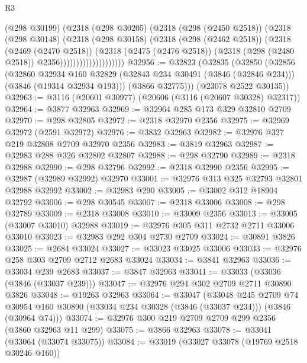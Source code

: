 \begin{lexlean}{R3}
\begin{coremodule}
                            (@298 @30199)
                            (@2318
                              (@298 @30205)
                              (@2318
                                (@298 (@2450 @2518))
                                (@2318
                                  (@298 @30148)
                                  (@2318
                                    (@298 @30158)
                                    (@2318
                                      (@298 (@2462 @2518))
                                      (@2318
                                        (@2469 (@2470 @2518))
                                        (@2318
                                          (@2475 (@2476 @2518))
                                          (@2318 (@298 (@2480 @2518)) @2356))))))))))))))))))))
@32956 := @32823
    (@32835
      (@32850
        (@32856
          (@32860
            @32934
            @160
            @32829
            (@32843 @234 @30491 (@3846 (@32846 @234)))
            (@3846 (@19314 @32934 @193)))
          (@3866 @32775)))
      (@23078 @2522 @30135))
@32963 := @3116 (@20601 @30977) (@20606 (@3116 (@20607 @30328) @32317))
@32964 := @3877 @32963
@32969 := @32964 @285 @173 @329 @32810 @2709
@32970 := @298 @32805
@32972 := @2318 @32970 @2356
@32975 := @32969 @32972 (@2591 @32972)
@32976 := @3832 @32963
@32982 := @32976 @327 @219 @32808 @2709 @32970 @2356
@32983 := @3819 @32963
@32987 := @32983 @288 @326 @32802 @32807
@32988 := @298 @32790
@32989 := @2318 @32988
@32990 := @298 @32796
@32992 := @2318 @32990 @2356
@32995 := @32987 (@32989 @32992) @32970
@33001 := @32976 @313 @325 @32793 @32801 @32988 @32992
@33002 := @32983 @290
@33005 := @33002 @312 @18904 @32792
@33006 := @298 @30545
@33007 := @2318 @33006
@33008 := @298 @32789
@33009 := @2318 @33008
@33010 := @33009 @2356
@33013 := @33005 (@33007 @33010) @32988
@33019 := @32976 @305 @311 @2732 @2711 @33006 @33010
@33023 := @32983 @292 @304 @2730 @2709
@33024 := @30891 @3826
@33025 := @2684 @33024
@33027 := @33023 @33025 @33006
@33033 := @32976 @258 @303 @2709 @2712 @2683 @33024
@33034 := @3841 @32963
@33036 := @33034 @239 @2683
@33037 := @3847 @32963
@33041 := @33033 (@33036 (@3846 (@33037 @239)))
@33047 := @32976 @294 @302 @2709 @2711 @30890 @3826
@33048 := @19263 @32963
@33064 := @33047
    (@33048
      @245
      @2709
      @74
      @30954
      @160
      @30890
      (@33034 @234 @30328 (@3846 (@33037 @234)))
      (@3846 (@30964 @74)))
@33074 := @32976 @300 @219 @2709 @2709 @299 @2356 (@3860 @32963 @11 @299)
@33075 := @3866 @32963
@33078 := @33041 (@33064 (@33074 @33075))
@33084 := @33019 (@33027 @33078 (@19769 @2518 @30246 @160))

\end{coremodule}
\end{lexlean}
